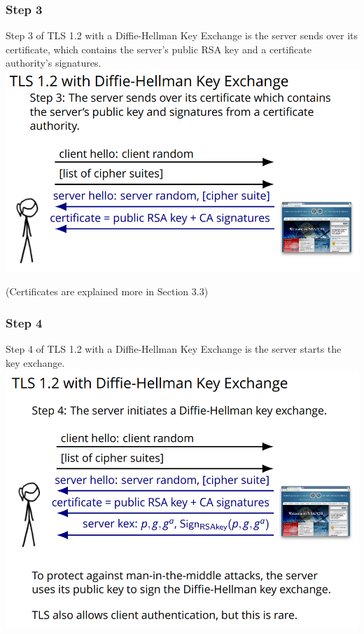 \documentclass[11pt]{article} %
\begin{document}
\newpage
\subsubsection{Step 3}
Step 3 of TLS 1.2 with a Diffie-Hellman Key Exchange is the server sends over 
its certificate, which contains the server’s public RSA key and a certificate 
authority's signatures.\\

\includegraphics[scale=.8]{./DiffieStep3.png}

(Certificates are explained more in Section 3.3)

\subsubsection{Step 4}
Step 4 of TLS 1.2 with a Diffie-Hellman Key Exchange is the server starts the 
key exchange.\\

\includegraphics[scale=.8]{./DiffieStep4.png}
\end{document}

